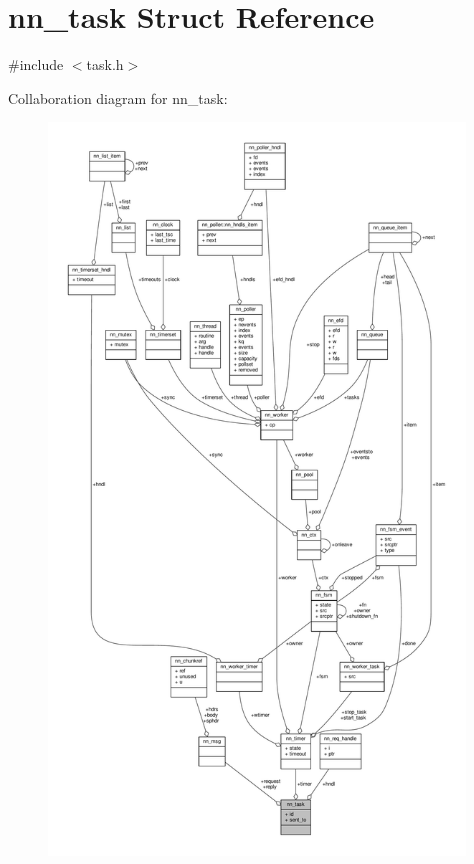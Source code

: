\hypertarget{structnn__task}{}\section{nn\+\_\+task Struct Reference}
\label{structnn__task}


{\ttfamily \#include $<$task.\+h$>$}



Collaboration diagram for nn\+\_\+task\+:\nopagebreak
\begin{figure}[H]
\begin{center}
\leavevmode
\includegraphics[height=550pt]{structnn__task__coll__graph}
\end{center}
\end{figure}
